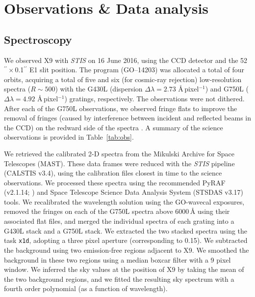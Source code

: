 \documentclass[a4paper,fleqn,usenatbib]{mnras}
\begin{document}
\section{Observations \& Data analysis}

\subsection{Spectroscopy}

We observed X9 with {\it STIS} on 16 June 2016, using the CCD detector and the 52$^{\prime\prime}\times$0.1$^{\prime\prime}$ E1 slit position. The program (GO--14203) was allocated a total of four orbits, acquiring a total of five and six (for cosmic-ray rejection) low-resolution spectra ($R \sim 500$) with the G430L (dispersion $\Delta \lambda = 2.73$ {\AA}\,pixel$^{-1}$) and G750L ($\Delta \lambda = 4.92$ {\AA}\,pixel$^{-1}$) gratings, respectively. The observations were not dithered. After each of the G750L observations, we observed fringe flats to improve the removal of fringes (caused by interference between incident and reflected beams in the CCD) on the redward side of the spectra \citep{2003PASP..115..218M}. A summary of the science observations is provided in Table~\ref{tab:obs}.

We retrieved the calibrated 2-D spectra from the Mikulski Archive for Space Telescopes (MAST). These data frames were reduced with the {\it STIS} pipeline (CALSTIS v3.4), using the calibration files closest in time to the science observations. We processed these spectra using the recommended PyRAF (v2.1.14; \citealp{1993ASPC...52..173T}) and Space Telescope Science Data Analysis System (STSDAS v3.17) tools. We recalibrated the wavelength solution using the GO-wavecal exposures, removed the fringes on each of the G750L spectra above 6000\,{\AA} using their associated flat files, and merged the individual spectra of each grating into a G430L stack and a G750L stack. We extracted the two stacked spectra using the task {\tt x1d}, adopting a three pixel aperture (corresponding to 0.15\arcsec). We subtracted the background using two emission-free regions adjacent to X9. We smoothed the background in these two regions using a median boxcar filter with a 9 pixel window. We inferred the sky values at the position of X9 by taking the mean of the two background regions, and we fitted the resulting sky spectrum with a fourth order polynomial (as a function of wavelength).
\end{document}
